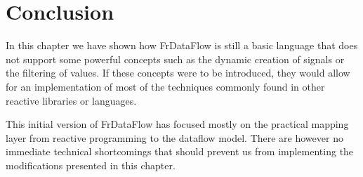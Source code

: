 \section{Conclusion}

In this chapter we have shown how FrDataFlow is still a basic language that does not support some powerful concepts such as the dynamic creation of signals or the filtering of values.
If these concepts were to be introduced, they would allow for an implementation of most of the techniques commonly found in other reactive libraries or languages.

This initial version of FrDataFlow has focused mostly on the practical mapping layer from reactive programming to the dataflow model. There are however no immediate technical shortcomings that should prevent us from implementing the modifications presented in this chapter.